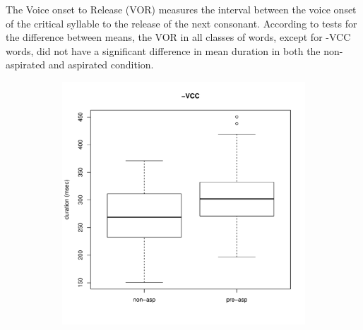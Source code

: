\documentclass[11pt,a4paper,openany]{memoir}\usepackage[]{graphicx}\usepackage[]{color}
\newenvironment{knitrout}{}{} %
\begin{document}
The Voice onset to Release (VOR) measures the interval between the voice onset of the critical syllable to the release of the next consonant.
According to tests for the difference between means, the VOR in all classes of words, except for -VCC words, did not have a significant difference in mean duration in both the non-aspirated and aspirated condition.



\begin{figure}
\begin{subfigure}{.5\textwidth}
\centering
\begin{knitrout}
\color{fgcolor}
\includegraphics[width=\textwidth]{img/mono-stop-vor-1} 


\end{knitrout}
\end{subfigure}
\end{figure}
\end{document}
